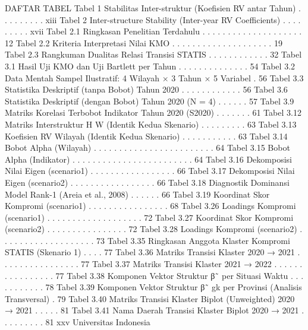 DAFTAR TABEL
Tabel 1 Stabilitas Inter-struktur (Koefisien RV antar Tahun) . . . . . . . . . xiii
Tabel 2 Inter-structure Stability (Inter-year RV Coefficients) . . . . . . . . . xvii
Tabel 2.1 Ringkasan Penelitian Terdahulu . . . . . . . . . . . . . . . . . . . . 12
Tabel 2.2 Kriteria Interpretasi Nilai KMO . . . . . . . . . . . . . . . . . . . . 19
Tabel 2.3 Rangkuman Dualitas Relasi Transisi STATIS . . . . . . . . . . . . 32
Tabel 3.1 Hasil Uji KMO dan Uji Bartlett per Tahun . . . . . . . . . . . . . . 54
Tabel 3.2 Data Mentah Sampel Ilustratif: 4 Wilayah × 3 Tahun × 5 Variabel . 56
Tabel 3.3 Statistika Deskriptif (tanpa Bobot) Tahun 2020 . . . . . . . . . . . . 56
Tabel 3.6 Statistika Deskriptif (dengan Bobot) Tahun 2020 (N = 4) . . . . . . 57
Tabel 3.9 Matriks Korelasi Terbobot Indikator Tahun 2020 (S2020) . . . . . . . 61
Tabel 3.12 Matriks Interstruktur H W (Identik Kedua Skenario) . . . . . . . . . 63
Tabel 3.13 Koefisien RV Wilayah (Identik Kedua Skenario) . . . . . . . . . . . 63
Tabel 3.14 Bobot Alpha (Wilayah) . . . . . . . . . . . . . . . . . . . . . . . . 64
Tabel 3.15 Bobot Alpha (Indikator) . . . . . . . . . . . . . . . . . . . . . . . . 64
Tabel 3.16 Dekomposisi Nilai Eigen (scenario1) . . . . . . . . . . . . . . . . . 66
Tabel 3.17 Dekomposisi Nilai Eigen (scenario2) . . . . . . . . . . . . . . . . . 66
Tabel 3.18 Diagnostik Dominansi Model Rank-1 (Areia et al., 2008) . . . . . . 66
Tabel 3.19 Koordinat Skor Kompromi (scenario1) . . . . . . . . . . . . . . . . 68
Tabel 3.26 Loadings Kompromi (scenario1) . . . . . . . . . . . . . . . . . . . 72
Tabel 3.27 Koordinat Skor Kompromi (scenario2) . . . . . . . . . . . . . . . . 72
Tabel 3.28 Loadings Kompromi (scenario2) . . . . . . . . . . . . . . . . . . . 73
Tabel 3.35 Ringkasan Anggota Klaster Kompromi STATIS (Skenario 1) . . . . 77
Tabel 3.36 Matriks Transisi Klaster 2020 → 2021 . . . . . . . . . . . . . . . . 77
Tabel 3.37 Matriks Transisi Klaster 2021 → 2022 . . . . . . . . . . . . . . . . 77
Tabel 3.38 Komponen Vektor Struktur β˜ per Situasi Waktu . . . . . . . . . . . 78
Tabel 3.39 Komponen Vektor Struktur β˜
gk per Provinsi (Analisis Transversal) . 79
Tabel 3.40 Matriks Transisi Klaster Biplot (Unweighted) 2020 → 2021 . . . . . 81
Tabel 3.41 Nama Daerah Transisi Klaster Biplot 2020 → 2021 . . . . . . . . . 81
xxv Universitas Indonesia

